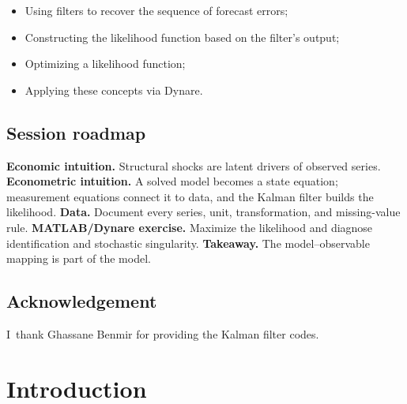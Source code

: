 \documentclass[a4paper,12pt]{article}%
\begin{document}
\FRONTPAGE%

\vspace{4ex}
\begin{myobjs}%


\begin{itemize}
\item Using filters to recover the sequence of forecast errors;

\item Constructing the likelihood function based on the filter's output;

\item Optimizing a likelihood function;

\item Applying these concepts via Dynare.
\end{itemize}

%

\end{myobjs}%

\subsection*{Session roadmap}
\textbf{Economic intuition.} Structural shocks are latent drivers of observed
series. \textbf{Econometric intuition.} A solved model becomes a state
equation; measurement equations connect it to data, and the Kalman filter
builds the likelihood. \textbf{Data.} Document every series, unit,
transformation, and missing-value rule. \textbf{MATLAB/Dynare exercise.}
Maximize the likelihood and diagnose identification and stochastic
singularity. \textbf{Takeaway.} The model--observable mapping is part of the model.


\subsection*{Acknowledgement}

I\ thank Ghassane Benmir for providing the Kalman filter codes.

\newpage

\section{Introduction}
\end{document}

